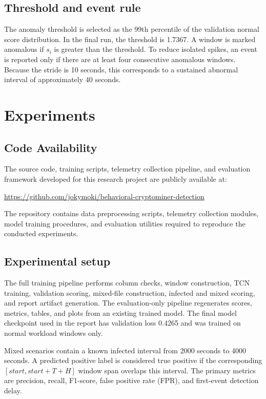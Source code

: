 \documentclass[a4paper,12pt]{extarticle}
\begin{document}
\subsection{Threshold and event rule}

The anomaly threshold is selected as the 99th percentile of the validation normal score distribution. In the final run, the threshold is 1.7367. A window is marked anomalous if $s_i$ is greater than the threshold. To reduce isolated spikes, an event is reported only if there are at least four consecutive anomalous windows. Because the stride is 10 seconds, this corresponds to a sustained abnormal interval of approximately 40 seconds.

\section{Experiments}
\label{sec:experiments}

\subsection{Code Availability}

The source code, training scripts, telemetry collection pipeline, 
and evaluation framework developed for this research project are publicly available at:

\url{https://github.com/jokymoki/behavioral-cryptominer-detection}

The repository contains data preprocessing scripts, telemetry collection modules,
model training procedures, and evaluation utilities required to reproduce
the conducted experiments.

\subsection{Experimental setup}

The full training pipeline performs column checks, window construction, TCN training, validation scoring, mixed-file construction, infected and mixed scoring, and report artifact generation. The evaluation-only pipeline regenerates scores, metrics, tables, and plots from an existing trained model. The final model checkpoint used in the report has validation loss 0.4265 and was trained on normal workload windows only.

Mixed scenarios contain a known infected interval from 2000 seconds to 4000 seconds. A predicted positive label is considered true positive if the corresponding $[start, start+T+H]$ window span overlaps this interval. The primary metrics are precision, recall, F1-score, false positive rate (FPR), and first-event detection delay.
\end{document}

